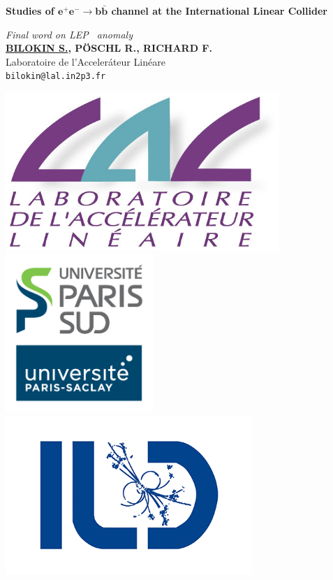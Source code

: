 \documentclass[a0,portrait]{a0poster}
\begin{document}
\BgThispage

\begin{minipage}[b]{1.\linewidth}
\veryHuge \color{NavyBlue} \textbf{Studies of $\pmb{ e^+e^-\to b\bar{b}}$ channel at the International Linear Collider} \color{Black} %
\end{minipage}
\begin{minipage}[b]{0.5\linewidth}
\Huge\textit{Final word on LEP \afb\ anomaly}\\[1cm]
\huge \textbf{\underline{BILOKIN S.}, P\"OSCHL R., RICHARD F.}\\[0.5cm] %
\huge Laboratoire de l'Acceler\'ateur Lin\'eare\\[0.4cm] %
\Large \texttt{bilokin@lal.in2p3.fr}
\end{minipage}
\begin{minipage}[b]{0.5\linewidth}
	\centering
\includegraphics[height=6cm]{figures/LAL.jpg}
\includegraphics[height=6cm]{figures/UPSUD.jpg}
\includegraphics[height=6cm]{figures/logo-ild.png}\\
\end{minipage}

\vspace{1cm} %


\begin{multicols}{2} 

\end{multicols}
\end{document}
